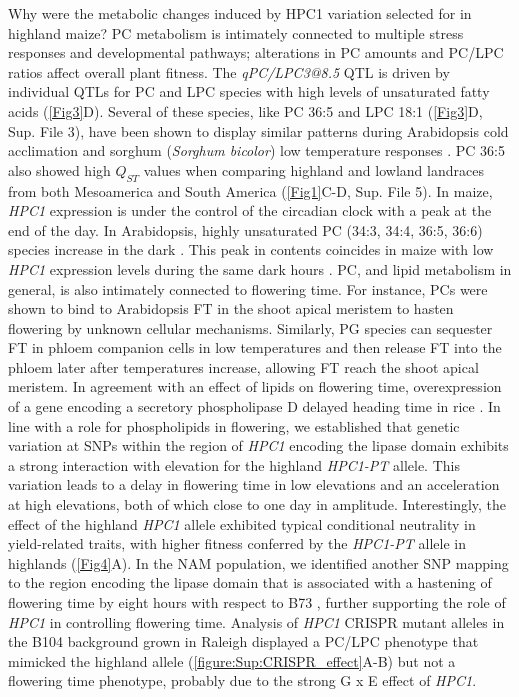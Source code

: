 \documentclass[9pt,twocolumn,twoside,lineno]{biorxiv}
\newcommand{\hpc}{\textit{HPC1}\xspace}
\begin{document}
Why were the metabolic changes induced by HPC1 variation selected for in highland maize?
PC metabolism is intimately connected to multiple stress responses and developmental pathways; alterations in PC amounts and PC/LPC ratios affect overall plant fitness.
The \textit{qPC/LPC3@8.5} QTL is driven by individual QTLs for PC and LPC species with high levels of unsaturated fatty acids (\cref{Fig3}D).
Several of these species, like PC 36:5 and LPC 18:1 (\cref{Fig3}D, Sup. File 3), have been shown to display similar patterns during Arabidopsis cold acclimation \cite{Welti2002-uk} and sorghum (\textit{Sorghum bicolor}) low temperature responses \cite{Marla2017-ph}.
PC 36:5 also showed high $Q_{ST}$ values when comparing highland and lowland landraces from both Mesoamerica and South America (\cref{Fig1}C-D, Sup. File 5).
In maize, \hpc expression is under the control of the circadian clock \cite{Khan2010-iv} with a peak at the end of the day. 
In Arabidopsis, highly unsaturated PC (34:3, 34:4, 36:5, 36:6) species increase in the dark \cite{Maatta2012-ip}. 
This peak in contents coincides in maize with low \hpc expression levels during the same dark hours \cite{Khan2010-iv}.
PC, and lipid metabolism in general, is also intimately connected to flowering time. 
For instance, PCs were shown to bind to Arabidopsis FT in the shoot apical meristem to hasten flowering \cite{Nakamura2014-qf, Nakamura2019-ht} by unknown cellular mechanisms. 
Similarly, PG species can sequester FT in phloem companion cells in low temperatures \cite{Susila2021-dz} and then release FT into the phloem later after temperatures increase, allowing FT reach the shoot apical meristem.   
In agreement with an effect of lipids on flowering time, overexpression of a gene encoding a secretory phospholipase D delayed heading time in rice \cite{Qu2021-wc}.
In line with a role for phospholipids in flowering, we established that genetic variation at SNPs within the region of \hpc encoding the lipase domain exhibits a strong interaction with elevation for the highland \textit{HPC1-PT} allele. 
This variation leads to a delay in flowering time in low elevations and an acceleration at high elevations, both of which close to one day in amplitude. 
Interestingly, the effect of the highland \hpc allele exhibited typical conditional neutrality in yield-related traits, with higher fitness conferred by the \textit{HPC1-PT} allele in highlands (\cref{Fig4}A). 
In the NAM population, we identified another SNP mapping to the region encoding the lipase domain that is associated with a hastening of flowering time by eight hours with respect to B73 \cite{Wallace2014-yy}, further supporting the role of \hpc in controlling flowering time. 
Analysis of \hpc CRISPR mutant alleles in the B104 background grown in Raleigh displayed a PC/LPC phenotype that mimicked the highland allele (\cref{figure:Sup:CRISPR_effect}A-B) but not a flowering time phenotype, probably due to the strong G x E effect of \hpc. 
\end{document}

